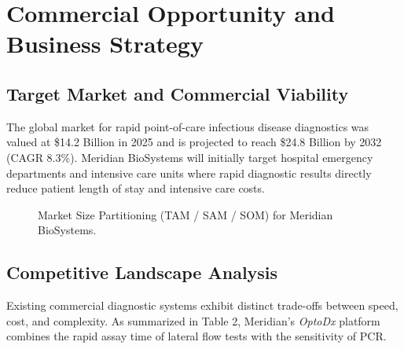 \documentclass[11pt,a4paper]{scrartcl}
\begin{document}
\section{Commercial Opportunity and Business Strategy}

\subsection{Target Market and Commercial Viability}
The global market for rapid point-of-care infectious disease diagnostics was valued at \$14.2 Billion in 2025 and is projected to reach \$24.8 Billion by 2032 (CAGR 8.3\%). Meridian BioSystems will initially target hospital emergency departments and intensive care units where rapid diagnostic results directly reduce patient length of stay and intensive care costs.

\begin{figure}[htbp]
\centering
{}
\caption{Market Size Partitioning (TAM / SAM / SOM) for Meridian BioSystems.}
\end{figure}

\subsection{Competitive Landscape Analysis}
Existing commercial diagnostic systems exhibit distinct trade-offs between speed, cost, and complexity. As summarized in Table 2, Meridian's \emph{OptoDx} platform combines the rapid assay time of lateral flow tests with the sensitivity of PCR.
\end{document}
